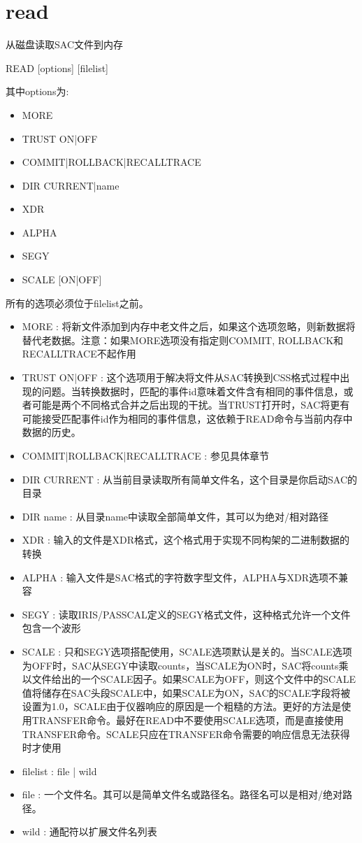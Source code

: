\section{read}
\label{cmd:read}

从磁盘读取SAC文件到内存

READ [options] [filelist]

其中options为:
\begin{itemize}
\item MORE
\item TRUST ON|OFF
\item COMMIT|ROLLBACK|RECALLTRACE
\item DIR CURRENT|name  
\item XDR  
\item ALPHA  
\item SEGY  
\item SCALE [ON|OFF] 
\end{itemize}
所有的选项必须位于filelist之前。

\begin{itemize}
\item MORE : 将新文件添加到内存中老文件之后，如果这个选项忽略，则新数据将替代老数据。注意：如果MORE选项没有指定则COMMIT, ROLLBACK和RECALLTRACE不起作用
\item TRUST ON|OFF : 这个选项用于解决将文件从SAC转换到CSS格式过程中出现的问题。当转换数据时，匹配的事件id意味着文件含有相同的事件信息，或者可能是两个不同格式合并之后出现的干扰。当TRUST打开时，SAC将更有可能接受匹配事件id作为相同的事件信息，这依赖于READ命令与当前内存中数据的历史。
\item COMMIT|ROLLBACK|RECALLTRACE : 参见具体章节 
\item DIR CURRENT : 从当前目录读取所有简单文件名，这个目录是你启动SAC的目录 
\item DIR name : 从目录name中读取全部简单文件，其可以为绝对/相对路径 
\item XDR : 输入的文件是XDR格式，这个格式用于实现不同构架的二进制数据的转换 
\item ALPHA : 输入文件是SAC格式的字符数字型文件，ALPHA与XDR选项不兼容 
\item SEGY : 读取IRIS/PASSCAL定义的SEGY格式文件，这种格式允许一个文件包含一个波形 
\item SCALE : 只和SEGY选项搭配使用，SCALE选项默认是关的。当SCALE选项为OFF时，SAC从SEGY中读取counts，当SCALE为ON时，SAC将counts乘以文件给出的一个SCALE因子。如果SCALE为OFF，则这个文件中的SCALE值将储存在SAC头段SCALE中，如果SCALE为ON，SAC的SCALE字段将被设置为1.0，SCALE由于仪器响应的原因是一个粗糙的方法。更好的方法是使用TRANSFER命令。最好在READ中不要使用SCALE选项，而是直接使用TRANSFER命令。SCALE只应在TRANSFER命令需要的响应信息无法获得时才使用 
\item filelist :  file | wild 
\item file : 一个文件名。其可以是简单文件名或路径名。路径名可以是相对/绝对路径。
\item wild : 通配符以扩展文件名列表 
\end{itemize}

